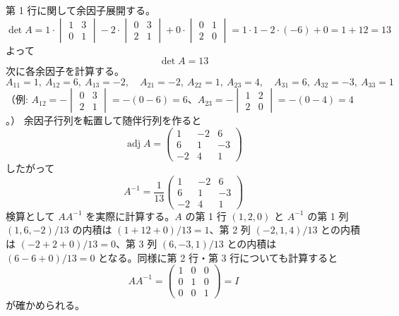
第 1 行に関して余因子展開する。
\[
\det A = 1\cdot\begin{vmatrix}1 & 3\\ 0 & 1\end{vmatrix}
- 2\cdot\begin{vmatrix}0 & 3\\ 2 & 1\end{vmatrix}
+ 0\cdot\begin{vmatrix}0 & 1\\ 2 & 0\end{vmatrix}
= 1\cdot 1 - 2\cdot(-6) + 0 = 1 + 12 = 13
\]
よって
\[
\boxed{\; \det A = 13 \;}
\]
次に各余因子を計算する。
\[
A_{11}=1,\ A_{12}=6,\ A_{13}=-2,\quad
A_{21}=-2,\ A_{22}=1,\ A_{23}=4,\quad
A_{31}=6,\ A_{32}=-3,\ A_{33}=1
\]
（例: $A_{12} = -\begin{vmatrix}0&3\\2&1\end{vmatrix} = -(0-6)=6$、$A_{23} = -\begin{vmatrix}1&2\\2&0\end{vmatrix} = -(0-4)=4$。）
余因子行列を転置して随伴行列を作ると
\[
\operatorname{adj}A =
\begin{pmatrix}
1 & -2 & 6 \\
6 & 1 & -3 \\
-2 & 4 & 1
\end{pmatrix}
\]
したがって
\[
\boxed{\; A^{-1} = \frac{1}{13}
\begin{pmatrix}
1 & -2 & 6 \\
6 & 1 & -3 \\
-2 & 4 & 1
\end{pmatrix} \;}
\]
検算として $AA^{-1}$ を実際に計算する。$A$ の第 1 行 $(1,2,0)$ と $A^{-1}$ の第 1 列 $(1,6,-2)/13$ の内積は $(1+12+0)/13=1$、第 2 列 $(-2,1,4)/13$ との内積は $(-2+2+0)/13=0$、第 3 列 $(6,-3,1)/13$ との内積は $(6-6+0)/13=0$ となる。同様に第 2 行・第 3 行についても計算すると
\[
AA^{-1} =
\begin{pmatrix}
1 & 0 & 0 \\
0 & 1 & 0 \\
0 & 0 & 1
\end{pmatrix} = I
\]
が確かめられる。

